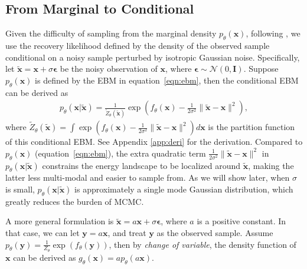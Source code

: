 \documentclass{article} \usepackage{iclr2021_conference,times}
\def\eqref#1{equation~\ref{#1}}
\def\rvx{{\mathbf{x}}}
\def\rvy{{\mathbf{y}}}
\def\mI{{\bm{I}}}
\def\N{{\mathcal N}}
\def\trvx{\tilde{\rvx}}
\def\beps{\bm{\epsilon}}
\begin{document}
\subsection{From Marginal to Conditional}
Given the difficulty of sampling from the marginal density $p_\theta(\rvx)$, following  \citet{bengio2013generalized}, we use the recovery likelihood defined by the density of the observed sample conditional on a noisy sample perturbed by isotropic Gaussian noise. Specifically, let $\tilde{\rvx} = \rvx + \sigma \beps$ be the noisy observation of $\rvx$, where $\beps \sim \N(0, \mI)$. Suppose $p_\theta(\rvx)$ is defined by the EBM in  \eqref{eqn:ebm}, then the conditional EBM can be derived as 
\begin{eqnarray} 
   p_\theta(\rvx|\trvx) = \frac{1}{\tilde{Z}_\theta(\trvx)} \exp\left(f_\theta(\rvx) - \frac{1}{2\sigma^2} \|\trvx-\rvx\|^2\right),  \label{eq:r}
\end{eqnarray}
where $\tilde{Z}_\theta(\trvx) = \int \exp\left(f_\theta(\rvx) - \frac{1}{2\sigma^2} \|\trvx-\rvx\|^2\right) d\rvx$ is the partition function of this conditional EBM. See Appendix \ref{app:deri} for the derivation. 
Compared to $p_\theta(\rvx)$ (\eqref{eqn:ebm}), the extra quadratic term $\frac{1}{2\sigma^2} \|\trvx-\rvx\|^2$ in $p_\theta(\rvx|\trvx)$ constrains the energy landscape to be localized around $\trvx$, making the latter less multi-modal and easier to sample from. As we will show later, when $\sigma$ is small, $p_\theta(\rvx|\trvx)$ is approximately a single mode Gaussian distribution, which greatly reduces the burden of MCMC. 

A more general formulation is $\trvx = a \rvx + \sigma \beps$, where $a$ is a positive constant. In that case, we can let $\rvy = a \rvx$, and treat $\rvy$ as the observed sample. Assume $p_\theta(\rvy) = \frac{1}{Z_\theta}\exp(f_\theta(\rvy))$, then by \emph{change of variable}, the density function of $\rvx$ can be derived as $g_\theta(\rvx) = a p_\theta(a \rvx)$.
\end{document}
